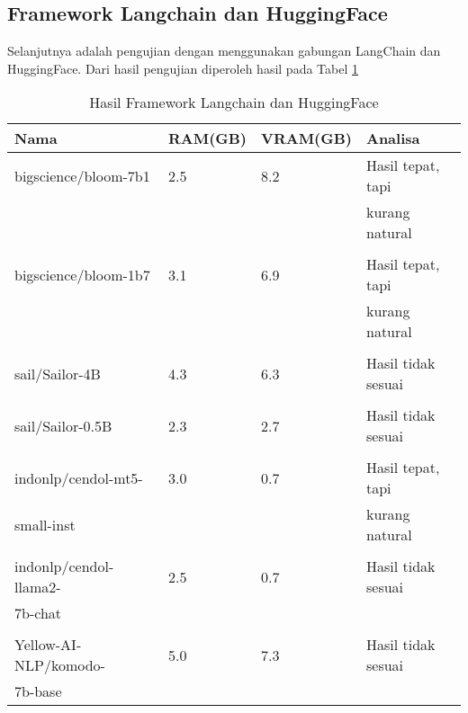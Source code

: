 \subsection{Framework Langchain dan HuggingFace}
Selanjutnya adalah pengujian dengan menggunakan gabungan LangChain dan HuggingFace. Dari hasil pengujian diperoleh hasil pada Tabel \ref{tab:hasilrag}
\begin{table}[!htbp]
    \caption{Hasil Framework Langchain dan HuggingFace}
    \label{tab:hasilrag}
    \centering
    \begin{tabular}{llll}
      \toprule
      Nama                      & RAM(GB)  & VRAM(GB)  & Analisa  \\
      \midrule
      bigscience/bloom-7b1      & 2.5      & 8.2       & Hasil tepat, tapi\\ \cite{muennighoff2022crosslingual}                          &          &           & kurang natural \\  
      \\
      bigscience/bloom-1b7
      \cite{muennighoff2022crosslingual}      & 3.1      & 6.9       & Hasil tepat, tapi\\
                                &          &           & kurang natural \\ 
      \\ 
      sail/Sailor-4B \cite{dou2024sailor}           & 4.3      & 6.3       & Hasil tidak sesuai\\
      \\
      sail/Sailor-0.5B \cite{dou2024sailor}          & 2.3      & 2.7       & Hasil tidak sesuai\\
      \\
      indonlp/cendol-mt5-       & 3.0      & 0.7       & Hasil tepat, tapi\\
      small-inst \cite{indonlp1,indonlp2, indonlp3, indonlp4, indonlp5, indonlp6, indonlp7}              &          &           & kurang natural \\ 
      \\
      indonlp/cendol-llama2-    & 2.5    & 0.7         & Hasil tidak sesuai\\
      7b-chat \cite{indonlp1,indonlp2, indonlp3, indonlp4, indonlp5, indonlp6, indonlp7}                  &          &           &  \\
      \\
      Yellow-AI-NLP/komodo-     & 5.0      & 7.3       & Hasil tidak sesuai\\
      7b-base \cite{owen2024komodo}                  &          &           &  \\

\end{tabular}
\end{table}
